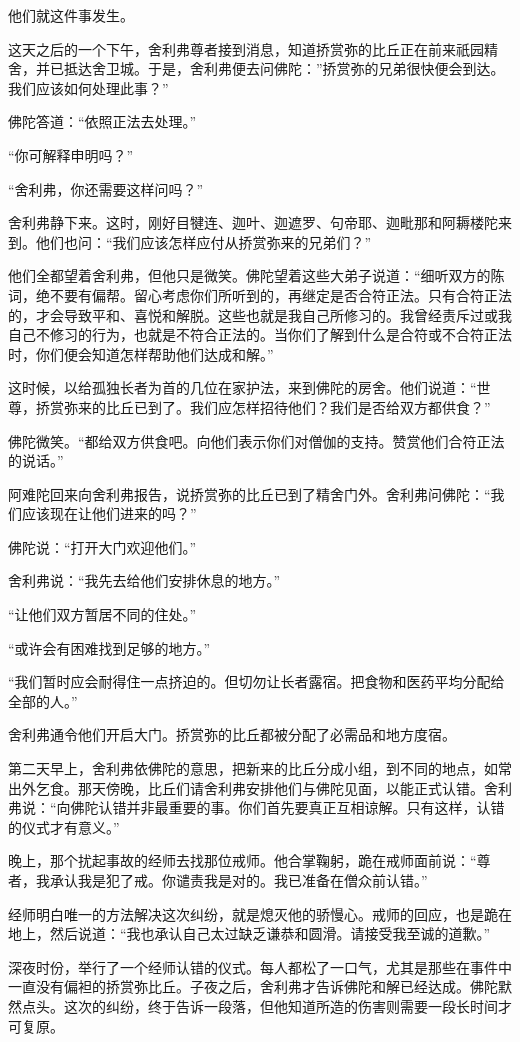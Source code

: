 \documentclass[12pt,twoside,openany]{book}
\begin{document}
他们就这件事发生。

这天之后的一个下午，舍利弗尊者接到消息，知道挢赏弥的比丘正在前来祇园精舍，并已抵达舍卫城。于是，舍利弗便去问佛陀：”挢赏弥的兄弟很快便会到达。我们应该如何处理此事？”

佛陀答道：“依照正法去处理。”

“你可解释申明吗？”

“舍利弗，你还需要这样问吗？”

舍利弗静下来。这时，刚好目犍连、迦叶、迦遮罗、句帝耶、迦毗那和阿耨楼陀来到。他们也问：“我们应该怎样应付从挢赏弥来的兄弟们？”

他们全都望着舍利弗，但他只是微笑。佛陀望着这些大弟子说道：“细听双方的陈词，绝不要有偏帮。留心考虑你们所听到的，再继定是否合符正法。只有合符正法的，才会导致平和、喜悦和解脱。这些也就是我自己所修习的。我曾经责斥过或我自己不修习的行为，也就是不符合正法的。当你们了解到什么是合符或不合符正法时，你们便会知道怎样帮助他们达成和解。”

这时候，以给孤独长者为首的几位在家护法，来到佛陀的房舍。他们说道：“世尊，挢赏弥来的比丘已到了。我们应怎样招待他们？我们是否给双方都供食？”

佛陀微笑。“都给双方供食吧。向他们表示你们对僧伽的支持。赞赏他们合符正法的说话。”

阿难陀回来向舍利弗报告，说挢赏弥的比丘已到了精舍门外。舍利弗问佛陀：“我们应该现在让他们进来的吗？”

佛陀说：“打开大门欢迎他们。”

舍利弗说：“我先去给他们安排休息的地方。”

“让他们双方暂居不同的住处。”

“或许会有困难找到足够的地方。”

“我们暂时应会耐得住一点挤迫的。但切勿让长者露宿。把食物和医药平均分配给全部的人。”

舍利弗通令他们开启大门。挢赏弥的比丘都被分配了必需品和地方度宿。

第二天早上，舍利弗依佛陀的意思，把新来的比丘分成小组，到不同的地点，如常出外乞食。那天傍晚，比丘们请舍利弗安排他们与佛陀见面，以能正式认错。舍利弗说：“向佛陀认错并非最重要的事。你们首先要真正互相谅解。只有这样，认错的仪式才有意义。”

晚上，那个扰起事故的经师去找那位戒师。他合掌鞠躬，跪在戒师面前说：“尊者，我承认我是犯了戒。你谴责我是对的。我已准备在僧众前认错。”

经师明白唯一的方法解决这次纠纷，就是熄灭他的骄慢心。戒师的回应，也是跪在地上，然后说道：“我也承认自己太过缺乏谦恭和圆滑。请接受我至诚的道歉。”

深夜时份，举行了一个经师认错的仪式。每人都松了一口气，尤其是那些在事件中一直没有偏袒的挢赏弥比丘。子夜之后，舍利弗才告诉佛陀和解已经达成。佛陀默然点头。这次的纠纷，终于告诉一段落，但他知道所造的伤害则需要一段长时间才可复原。
\end{document}
